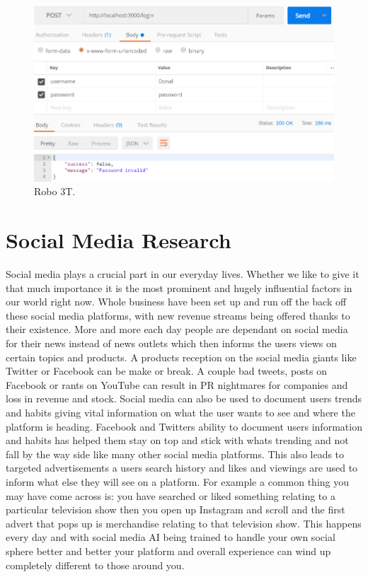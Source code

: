 \begin{figure}[H]
\centering
\includegraphics[]{img/postman.png}
\caption{Robo 3T.}
\end{figure}


\section{Social Media Research}

Social media plays a crucial part in our everyday lives. Whether we like to give it that much importance it is the most prominent and hugely influential factors in our world right now. Whole business have been set up and run off the back off these social media platforms, with new revenue streams being offered thanks to their existence. More and more each day people are dependant on social media for their news instead of news outlets which then informs the users views on certain topics and products. A products reception on the social media giants like Twitter or Facebook can be make or break. A couple bad tweets, posts on Facebook or rants on YouTube can result in PR nightmares for companies and loss in revenue and stock. Social media can also be used to document users trends and habits giving vital information on what the user wants to see and where the platform is heading. 
Facebook and Twitters ability to document users information and habits has helped them stay on top and stick with whats trending and not fall by the way side like many other social media platforms. This also leads to targeted advertisements a users search history and likes and viewings are used to inform what else they will see on a platform. For example a common thing you may have come across is: you have searched or liked something relating to a particular television show then you open up Instagram and scroll and the first advert that pops up is merchandise relating to that television show. This happens every day and with social media AI being trained to handle your own social sphere better and better your platform and overall experience can wind up completely different to those around you. 

